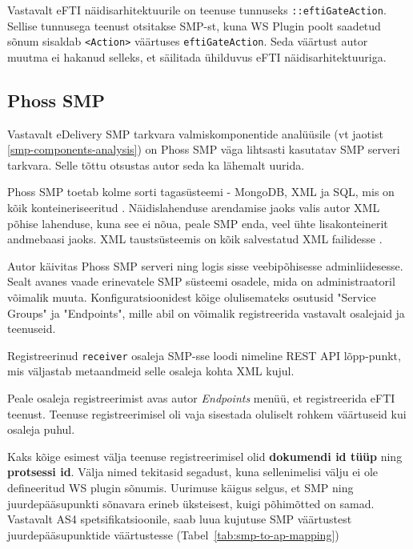Vastavalt eFTI näidisarhitektuurile \cite{efti4eu_reference_impl} on teenuse tunnuseks \texttt{::eftiGateAction}.
Sellise tunnusega teenust otsitakse SMP-st, kuna WS Plugin poolt saadetud sõnum sisaldab 
\texttt{<Action>} väärtuses \texttt{eftiGateAction}. Seda väärtust autor muutma ei hakanud 
selleks, et säilitada ühilduvus eFTI näidisarhitektuuriga.  


\subsection{Phoss SMP}
Vastavalt eDelivery SMP tarkvara valmiskomponentide analüüsile (vt jaotist \ref{smp-components-analysis})
on Phoss SMP väga lihtsasti kasutatav SMP serveri tarkvara. 
Selle tõttu otsustas autor seda ka lähemalt uurida.

Phoss SMP toetab kolme sorti tagasüsteemi - MongoDB, XML ja SQL, mis on kõik konteineriseeritud \cite{phax_phoss_smp}.
Näidislahenduse arendamise jaoks valis autor XML põhise lahenduse, kuna see ei nõua, peale SMP enda, 
veel ühte lisakonteinerit andmebaasi jaoks. XML taustsüsteemis on kõik salvestatud XML failidesse \cite{phelger_phoss_smp_xml_docker}.

Autor käivitas Phoss SMP serveri ning logis sisse veebipõhisesse adminliidesesse. Sealt avanes vaade erinevatele
SMP süsteemi osadele, mida on administraatoril võimalik muuta. Konfiguratsioonidest kõige olulisemateks osutusid 
"Service Groups" ja "Endpoints", mille abil on võimalik registreerida vastavalt osalejaid ja teenuseid.

Registreerinud \texttt{receiver} osaleja SMP-sse loodi
\texttt{}
nimeline REST API lõpp-punkt, mis väljastab metaandmeid selle osaleja kohta XML kujul.

Peale osaleja registreerimist avas autor \textit{Endpoints} menüü, et registreerida eFTI teenust.
Teenuse registreerimisel oli vaja sisestada oluliselt rohkem väärtuseid kui osaleja puhul.

Kaks kõige esimest välja teenuse registreerimisel olid \textbf{dokumendi id tüüp} ning \textbf{protsessi id}.
Välja nimed tekitasid segadust, kuna sellenimelisi välju ei ole defineeritud WS plugin sõnumis.
Uurimuse käigus selgus, et SMP ning juurdepääsupunkti sõnavara erineb üksteisest, kuigi põhimõtted on samad.
Vastavalt AS4 spetsifikatsioonile, saab luua kujutuse SMP väärtustest juurdepääsupunktide väärtustesse 
\cite[ptk 5]{peppol_as4_spec} (Tabel~\ref{tab:smp-to-ap-mapping})

